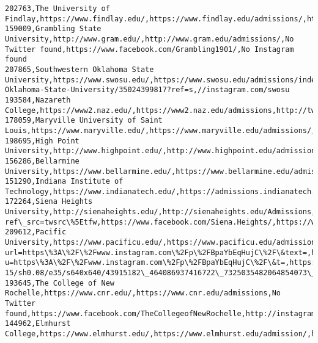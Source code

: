 \documentclass[11pt]{article}
\begin{document}
\begin{Verbatim}[commandchars=\\\{\}]
202763,The University of Findlay,https://www.findlay.edu/,https://www.findlay.edu/admissions/,https://twitter.com/ufindlay,https://www.facebook.com/universityfindlay,https://www.instagram.com/ufindlay/
159009,Grambling State University,http://www.gram.edu/,http://www.gram.edu/admissions/,No Twitter found,https://www.facebook.com/Grambling1901/,No Instagram found
207865,Southwestern Oklahoma State University,https://www.swosu.edu/,https://www.swosu.edu/admissions/index.aspx,//twitter.com/swosu,//www.facebook.com/pages/Southwestern-Oklahoma-State-University/35024399817?ref=s,//instagram.com/swosu
193584,Nazareth College,https://www2.naz.edu/,https://www2.naz.edu/admissions,http://twitter.com/nazarethcollege,http://www.facebook.com/NazarethCollege,http://instagram.com/nazarethcollege
178059,Maryville University of Saint Louis,https://www.maryville.edu/,https://www.maryville.edu/admissions/,http://www.twitter.com/maryvilleu,http://www.facebook.com/MaryvilleUniversity,https://instagram.com/maryvilleu/
198695,High Point University,http://www.highpoint.edu/,http://www.highpoint.edu/admissions/,https://twitter.com/HighPointU,https://www.facebook.com/HighPointU,http://instagram.com/highpointu
156286,Bellarmine University,https://www.bellarmine.edu/,https://www.bellarmine.edu/admissions/,https://twitter.com/bellarmineu,https://facebook.com/bellarmineu,https://www.instagram.com/bellarmineu/
151290,Indiana Institute of Technology,https://www.indianatech.edu/,https://admissions.indianatech.edu/,https://twitter.com/indianatech,https://www.facebook.com/indianatech,https://instagram.com/indianatech
172264,Siena Heights University,http://sienaheights.edu/,http://sienaheights.edu/Admissions,https://twitter.com/sienaheights?ref\_src=twsrc\%5Etfw,https://www.facebook.com/Siena.Heights/,https://www.instagram.com/realsaints/
209612,Pacific University,https://www.pacificu.edu/,https://www.pacificu.edu/admissions,https://twitter.com/share?url=https\%3A\%2F\%2Fwww.instagram.com\%2Fp\%2FBpaYbEqHujC\%2F\&text=,http://www.facebook.com/sharer.php?u=https\%3A\%2F\%2Fwww.instagram.com\%2Fp\%2FBpaYbEqHujC\%2F\&t=,https://scontent.cdninstagram.com/vp/862aa793b977696f568a7c7e82bf3668/5C50606B/t51.2885-15/sh0.08/e35/s640x640/43915182\_464086937416722\_7325035482064854073\_n.jpg
193645,The College of New Rochelle,https://www.cnr.edu/,https://www.cnr.edu/admissions,No Twitter found,https://www.facebook.com/TheCollegeofNewRochelle,http://instagram.com/thecollegeofnewrochelle\#
144962,Elmhurst College,https://www.elmhurst.edu/,https://www.elmhurst.edu/admission/,https://twitter.com/ConnieMixon,https://www.facebook.com/86293358032/posts/10156847304023033,https://www.instagram.com/p/Bpc1cnDHVpI/

\end{Verbatim}
\end{document}
